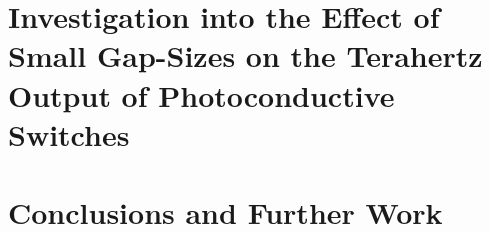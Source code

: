 \documentclass[oneside, 12pt]{report}
\numberwithin{equation}{section}
\begin{document}
\chapter{Investigation into the Effect of Small Gap-Sizes on the Terahertz Output of Photoconductive Switches}
\label{ch:sys_dev}


\chapter{Conclusions and Further Work}
\label{ch:conclusions}


\printbibliography

%
\end{document}
